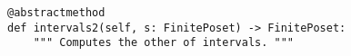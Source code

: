\par\begin{minipage}{60ex}
\begin{verbatim}
@abstractmethod
def intervals2(self, s: FinitePoset) -> FinitePoset:
    """ Computes the other of intervals. """
\end{verbatim}
\end{minipage}\par
